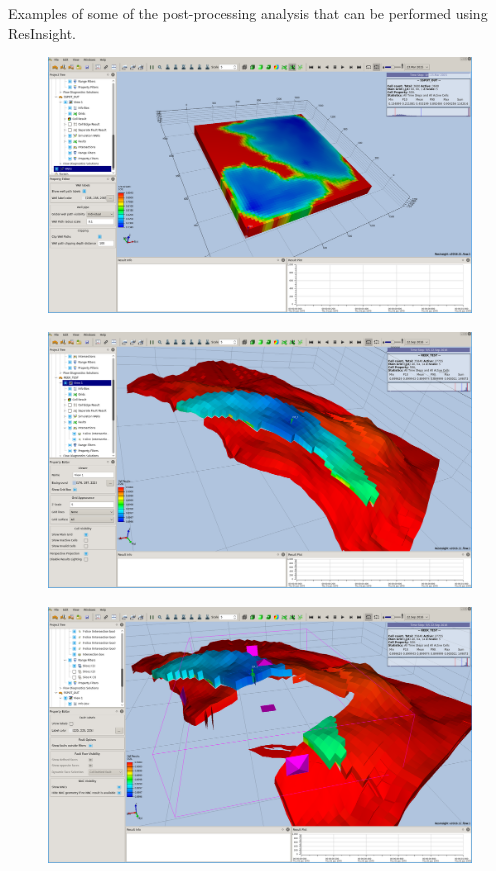 Examples of some of the post-processing analysis 
that can be performed using ResInsight.

\begin{figure}[h!]
\centering
\includegraphics[scale=.25]{images/Screenshot-resinsight-5spot-soil.png}
\end{figure}

\begin{figure}[h!]
\centering
\includegraphics[scale=.25]{images/Screenshot-resinsight-reek-soil.png}
\end{figure}
\vspace{30mm}

\begin{figure}[h!]
\centering
\includegraphics[scale=.25]{images/Screenshot-resinsight-reek-soil-range-filters.png}
\end{figure}


